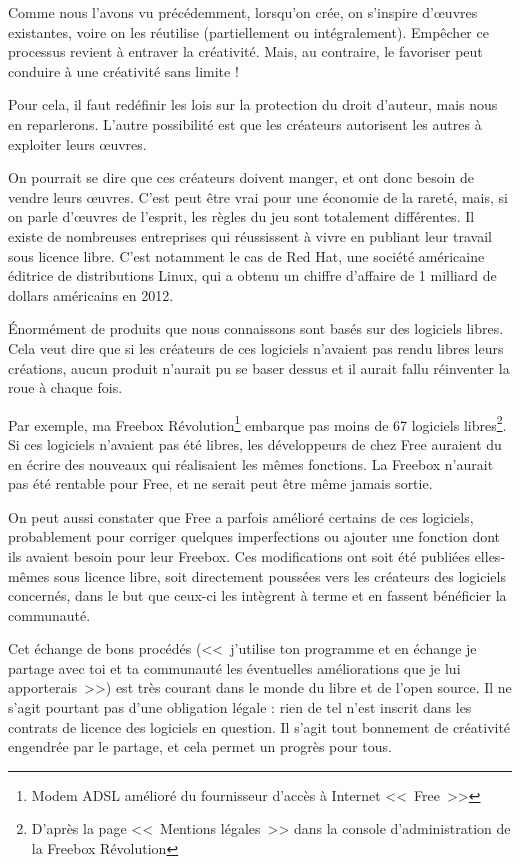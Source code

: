 Comme nous l'avons vu précédemment, lorsqu'on crée, on s'inspire d'œuvres existantes, voire on les réutilise (partiellement ou intégralement).
Empêcher ce processus revient à entraver la créativité.
Mais, au contraire, le favoriser peut conduire à une créativité sans limite !

Pour cela, il faut redéfinir les lois sur la protection du droit d'auteur, mais nous en reparlerons.
L'autre possibilité est que les créateurs autorisent les autres à exploiter leurs œuvres.

On pourrait se dire que ces créateurs doivent manger, et ont donc besoin de vendre leurs œuvres.
C'est peut être vrai pour une économie de la rareté, mais, si on parle d'œuvres de l'esprit, les règles du jeu sont totalement différentes.
Il existe de nombreuses entreprises qui réussissent à vivre en publiant leur travail sous licence libre.
C'est notamment le cas de Red Hat, une société américaine éditrice de distributions Linux, qui a obtenu un chiffre d'affaire de 1 milliard de dollars américains en 2012.

Énormément de produits que nous connaissons sont basés sur des logiciels libres.
Cela veut dire que si les créateurs de ces logiciels n'avaient pas rendu libres leurs créations, aucun produit n'aurait pu se baser dessus et il aurait fallu réinventer la roue à chaque fois.

Par exemple, ma Freebox Révolution\footnote{Modem ADSL amélioré du fournisseur d'accès à Internet <<~Free~>>} embarque pas moins de 67 logiciels libres\footnote{D'après la page <<~Mentions légales~>> dans la console d'administration de la Freebox Révolution}.
Si ces logiciels n'avaient pas été libres, les développeurs de chez Free auraient du en écrire des nouveaux qui réalisaient les mêmes fonctions.
La Freebox n'aurait pas été rentable pour Free, et ne serait peut être même jamais sortie.

On peut aussi constater que Free a parfois amélioré certains de ces logiciels, probablement pour corriger quelques imperfections ou ajouter une fonction dont ils avaient besoin pour leur Freebox.
Ces modifications ont soit été publiées elles-mêmes sous licence libre, soit directement poussées vers les créateurs des logiciels concernés, dans le but que ceux-ci les intègrent à terme et en fassent bénéficier la communauté.

Cet échange de bons procédés (<<~j'utilise ton programme et en échange je partage avec toi et ta communauté les éventuelles améliorations que je lui apporterais~>>) est très courant dans le monde du libre et de l'open source.
Il ne s'agit pourtant pas d'une obligation légale : rien de tel n'est inscrit dans les contrats de licence des logiciels en question.
Il s'agit tout bonnement de créativité engendrée par le partage, et cela permet un progrès pour tous.

